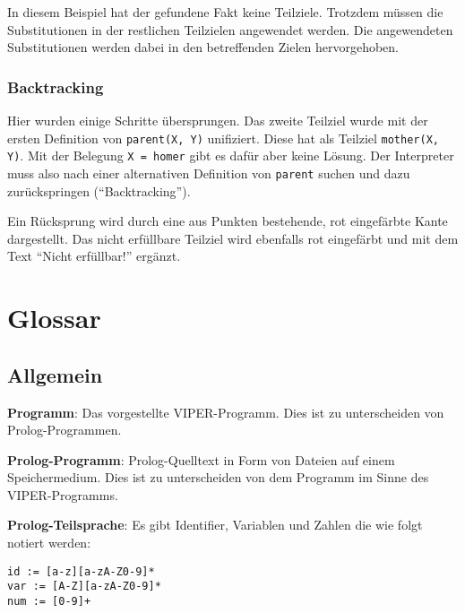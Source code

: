 \documentclass[parskip=full,11pt,twoside]{scrartcl}
\begin{document}
In diesem Beispiel hat der gefundene Fakt keine Teilziele.
Trotzdem müssen die Substitutionen in der restlichen Teilzielen angewendet werden.
Die angewendeten Substitutionen werden dabei in den betreffenden Zielen hervorgehoben.

\subsubsection{Backtracking}

Hier wurden einige Schritte übersprungen.
Das zweite Teilziel wurde mit der ersten Definition von \texttt{parent(X, Y)} unifiziert.
Diese hat als Teilziel \texttt{mother(X, Y)}.
Mit der Belegung \texttt{X = homer} gibt es dafür aber keine Lösung.
Der Interpreter muss also nach einer alternativen Definition von \texttt{parent} suchen und dazu zurückspringen (\enquote{Backtracking}).

\begin{minipage}{\linewidth}
\end{minipage}

Ein Rücksprung wird durch eine aus Punkten bestehende, rot eingefärbte Kante dargestellt.
Das nicht erfüllbare Teilziel wird ebenfalls rot eingefärbt und mit dem Text \enquote{Nicht erfüllbar!} ergänzt.

\section{Glossar}

\subsection{Allgemein}

\textbf{Programm}:
Das vorgestellte VIPER-Programm. Dies ist zu unterscheiden von Prolog-Programmen.

\textbf{Prolog-Programm}:
Prolog-Quelltext in Form von Dateien auf einem Speichermedium. Dies ist zu unterscheiden von dem Programm im Sinne des VIPER-Programms.

\textbf{Prolog-Teilsprache}:
\label{prolog-language}
Es gibt Identifier, Variablen und Zahlen die wie folgt notiert werden:

\begin{lstlisting}
id := [a-z][a-zA-Z0-9]*
var := [A-Z][a-zA-Z0-9]*
num := [0-9]+
\end{lstlisting}
\end{document}
